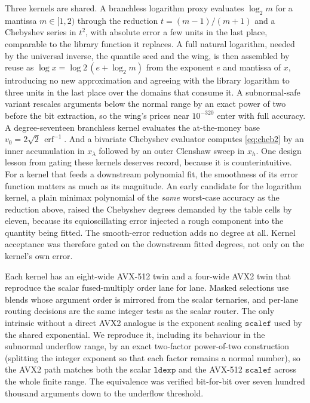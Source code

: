 \documentclass[11pt]{article}
\newcommand{\erf}{\operatorname{erf}}
\begin{document}
Three kernels are shared. A branchless logarithm proxy evaluates $\log_2 m$ for a mantissa $m\in[1,2)$ through the reduction $t=(m-1)/(m+1)$ and a Chebyshev series in $t^2$, with absolute error a few units in the last place, comparable to the library function it replaces. A full natural logarithm, needed by the universal inverse, the quantile seed and the wing, is then assembled by reuse as $\log x=\log2\,(e+\log_2 m)$ from the exponent $e$ and mantissa of $x$, introducing no new approximation and agreeing with the library logarithm to three units in the last place over the domains that consume it. A subnormal-safe variant rescales arguments below the normal range by an exact power of two before the bit extraction, so the wing's prices near $10^{-320}$ enter with full accuracy. A degree-seventeen branchless kernel evaluates the at-the-money base $v_0=2\sqrt2\,\erf^{-1}$. And a bivariate Chebyshev evaluator computes \eqref{eq:cheb2} by an inner accumulation in $x_\lambda$ followed by an outer Clenshaw sweep in $x_h$. One design lesson from gating these kernels deserves record, because it is counterintuitive. For a kernel that feeds a downstream polynomial fit, the smoothness of its error function matters as much as its magnitude. An early candidate for the logarithm kernel, a plain minimax polynomial of the \emph{same} worst-case accuracy as the reduction above, raised the Chebyshev degrees demanded by the table cells by eleven, because its equioscillating error injected a rough component into the quantity being fitted. The smooth-error reduction adds no degree at all. Kernel acceptance was therefore gated on the downstream fitted degrees, not only on the kernel's own error.

Each kernel has an eight-wide AVX-512 twin and a four-wide AVX2 twin that reproduce the scalar fused-multiply order lane for lane. Masked selections use blends whose argument order is mirrored from the scalar ternaries, and per-lane routing decisions are the same integer tests as the scalar router. The only intrinsic without a direct AVX2 analogue is the exponent scaling $\mathtt{scalef}$ used by the shared exponential. We reproduce it, including its behaviour in the subnormal underflow range, by an exact two-factor power-of-two construction (splitting the integer exponent so that each factor remains a normal number), so the AVX2 path matches both the scalar $\mathtt{ldexp}$ and the AVX-512 $\mathtt{scalef}$ across the whole finite range. The equivalence was verified bit-for-bit over seven hundred thousand arguments down to the underflow threshold.
\end{document}
